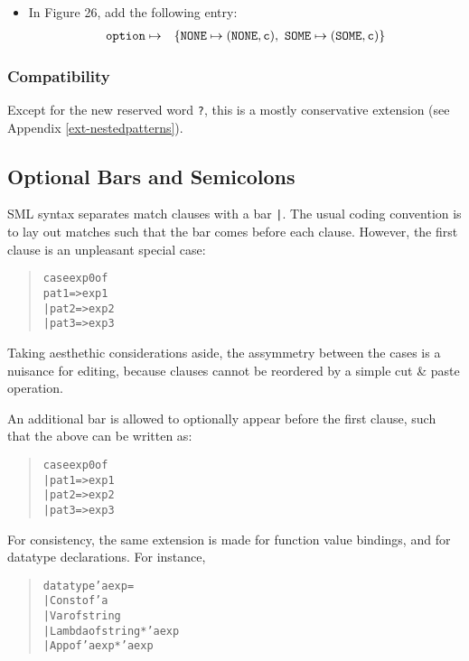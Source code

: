 \documentclass[twoside,titlepage]{article}
\begin{document}
\begin{appendix}
\begin{itemize}
\item In Figure 26, add the following entry:
  \begin{eqnarray*}
  {\tt{option}} &\mapsto& \{{\tt{NONE}}\mapsto({\tt{NONE}},{\tt{c}}),~{\tt{SOME}}\mapsto({\tt{SOME}},{\tt{c}})\}
  \end{eqnarray*}
\end{itemize}

\subsubsection*{Compatibility}

Except for the new reserved word {\tt?}, this is a mostly conservative extension (see Appendix \ref{ext-nestedpatterns}).


\subsection{Optional Bars and Semicolons}
\label{ext-bars}

SML syntax separates match clauses with a bar {\tt|}. The usual coding convention is to lay out matches such that the bar comes before each clause. However, the first clause is an unpleasant special case:
\begin{quote}
\begin{alltt}
case exp0 of
    pat1 => exp1
  | pat2 => exp2
  | pat3 => exp3
\end{alltt}
\end{quote}
Taking aesthethic considerations aside, the assymmetry between the cases is a nuisance for editing, because clauses cannot be reordered by a simple cut \& paste operation.

An additional bar is allowed to optionally appear before the first clause, such that the above can be written as:
\begin{quote}
\begin{alltt}
case exp0 of
  | pat1 => exp1
  | pat2 => exp2
  | pat3 => exp3
\end{alltt}
\end{quote}
For consistency, the same extension is made for function value bindings, and for datatype declarations. For instance,
\begin{quote}
\begin{alltt}
datatype 'a exp =
  | Const  of 'a
  | Var    of string
  | Lambda of string * 'a exp
  | App    of 'a exp * 'a exp
\end{alltt}
\end{quote}


\end{appendix}
\end{document}

